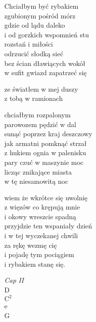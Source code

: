 \begin{text}
    \hfill\break
    Chciałbym być rybakiem\\
    zgubionym pośród mórz\\
    gdzie od lądu daleko\\
    i od gorzkich wspomnień stu\\
    rozstań i miłości\\
    odrzucić słodką sieć\\
    bez ścian dławiących wokół\\
    w sufit gwiazd zapatrzeć się

    ze światłem w mej duszy\\
    z tobą w ramionach

    chciałbym rozpalonym\\
    parowozem pędzić w dal\\
    sunąć poprzez kraj deszczowy\\
    jak armatni pomknąć strzał\\
    z hukiem ognia w palenisku\\
    pary czuć w maszynie moc\\
    licząc znikające miasta\\
    w tę niesamowitą noc

    wiem że wkrótce się uwolnię\\
    z więzów co krępują mnie\\
    i okowy wreszcie spadną\\
    przyjdzie ten wspaniały dzień\\
    i w tej wyczekanej chwili\\
    za rękę wezmę cię\\
    i pojadę tym pociągiem\\
    i rybakiem stanę się.
\end{text}
\begin{chord}
    \textit{Cap II}\\
    D\\
    $\mathrm{C^2}$\\
    e\\
    G
\end{chord}
